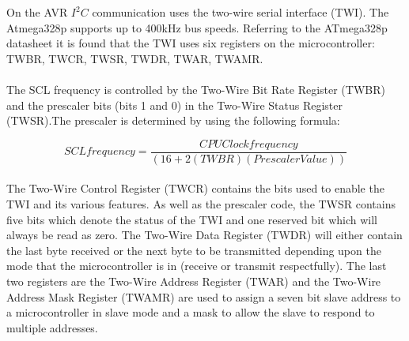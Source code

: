 On the AVR $I^{2}C$ communication uses the two-wire serial interface (TWI). The Atmega328p supports up to 400kHz bus speeds. Referring to the ATmega328p datasheet it is found that the TWI uses six registers on the microcontroller: TWBR, TWCR, TWSR, TWDR, TWAR, TWAMR.
\paragraph{}
The SCL frequency is controlled by the Two-Wire Bit Rate Register (TWBR) and the prescaler bits (bits 1 and 0) in the Two-Wire Status Register (TWSR).The prescaler is determined by using the following formula:

\begin{equation} 
SCL frequency = \frac{CPU Clock frequency}{(16 + 2(TWBR)(Prescaler Value))}
\label{clkfreq}
\end{equation}
\paragraph{}
The Two-Wire Control Register (TWCR) contains the bits used to enable the TWI and its various features.  As well as the prescaler code, the TWSR contains five bits which denote the status of the TWI and one reserved bit which will always be read as zero.  The Two-Wire Data Register (TWDR) will either contain the last byte received or the next byte to be transmitted depending upon the mode that the microcontroller is in (receive or transmit respectfully).  The last two registers are the Two-Wire Address Register (TWAR) and the Two-Wire Address Mask Register (TWAMR) are used to assign a seven bit slave address to a microcontroller in slave mode and a mask to allow the slave to respond to multiple addresses.  
